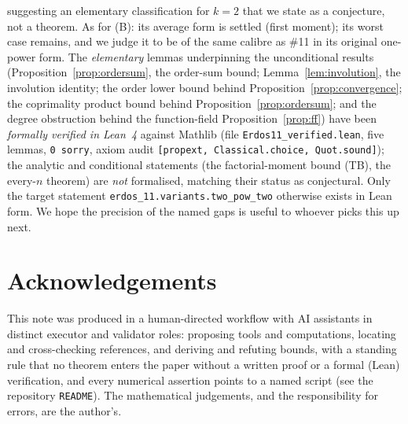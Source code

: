 \documentclass[11pt]{article}
\theoremstyle{plain}
\theoremstyle{definition}
\theoremstyle{remark}
\begin{document}
suggesting an elementary classification for $k=2$ that we state as a conjecture,
not a theorem. As for (B): its average form is settled (first moment); its
worst case remains, and we judge it to be of the same calibre as \#11 in its
original one-power form. The
\emph{elementary} lemmas underpinning the unconditional results
(Proposition~\ref{prop:ordersum}, the order-sum bound; Lemma~\ref{lem:involution},
the involution identity; the order lower bound behind
Proposition~\ref{prop:convergence}; the coprimality product bound behind
Proposition~\ref{prop:ordersum}; and the degree obstruction behind the
function-field Proposition~\ref{prop:ff}) have been \emph{formally verified in
Lean~4} against Mathlib (file \texttt{Erdos11\_verified.lean}, five lemmas,
\texttt{0 sorry}, axiom audit \texttt{[propext, Classical.choice, Quot.sound]});
the analytic and
conditional statements (the factorial-moment bound (TB), the every-$n$ theorem)
are \emph{not} formalised, matching their status as conjectural. Only the target
statement \texttt{erdos\_11.variants.two\_pow\_two} otherwise exists in Lean form.
We hope the precision of the named gaps is useful to whoever picks this up next.

\section*{Acknowledgements}
This note was produced in a human-directed workflow with AI assistants in
distinct executor and validator roles: proposing tools and computations,
locating and cross-checking references, and deriving and refuting bounds, with a
standing rule that no theorem enters the paper without a written proof or a
formal (Lean) verification, and every numerical assertion points to a named
script (see the repository \texttt{README}). The mathematical judgements,
and the responsibility for errors, are the author's.
\end{document}
